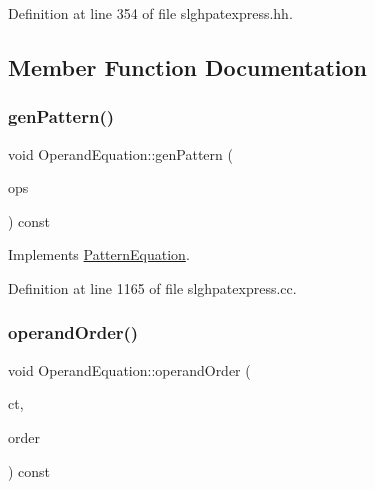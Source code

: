 Definition at line 354 of file slghpatexpress.\+hh.



\subsection{Member Function Documentation}
\mbox{\label{class_operand_equation_a058969ecd084d4b79a36f0d153a3e972}} 
\subsubsection{\texorpdfstring{genPattern()}{genPattern()}}
{\footnotesize\ttfamily void Operand\+Equation\+::gen\+Pattern (\begin{DoxyParamCaption}\item[{const vector$<$ \mbox{\hyperlink{class_token_pattern}{Token\+Pattern}} $>$ \&}]{ops }\end{DoxyParamCaption}) const\hspace{0.3cm}{\ttfamily [virtual]}}



Implements \mbox{\hyperlink{class_pattern_equation_a9838e5bfe5b6013c99567628a6364bfd}{Pattern\+Equation}}.



Definition at line 1165 of file slghpatexpress.\+cc.

\mbox{\label{class_operand_equation_ae6c672be7a442660c2923112b7dd3a4d}} 
\subsubsection{\texorpdfstring{operandOrder()}{operandOrder()}}
{\footnotesize\ttfamily void Operand\+Equation\+::operand\+Order (\begin{DoxyParamCaption}\item[{\mbox{\hyperlink{class_constructor}{Constructor}} $\ast$}]{ct,  }\item[{vector$<$ \mbox{\hyperlink{class_operand_symbol}{Operand\+Symbol}} $\ast$ $>$ \&}]{order }\end{DoxyParamCaption}) const\hspace{0.3cm}{\ttfamily [virtual]}}



